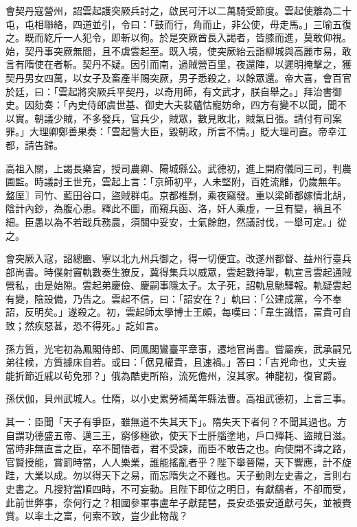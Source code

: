 \begin{pinyinscope}
 會契丹寇營州，詔雲起護突厥兵討之，啟民可汗以二萬騎受節度。雲起使離為二十屯，屯相聯絡，四道並引，令曰：「鼓而行，角而止，非公使，毋走馬。」三喻五復之。既而紇斤一人犯令，即斬以徇。於是突厥酋長入謁者，皆膝而進，莫敢仰視。始，契丹事突厥無間，且不虞雲起至。既入境，使突厥紿云詣柳城與高麗市易，敢言有隋使在者斬。契丹不疑。因引而南，過賊營百里，夜還陣，以遲明掩擊之，獲契丹男女四萬，以女子及畜產半賜突厥，男子悉殺之，以餘眾還。帝大喜，會百官於廷，曰：「雲起將突厥兵平契丹，以奇用師，有文武才，朕自舉之。」拜治書御史。因劾奏：「內史侍郎虞世基、御史大夫裴蘊怙寵妨命，四方有變不以聞，聞不以實。朝議少賊，不多發兵，官兵少，賊眾，數見敗北，賊氣日張。請付有司案罪。」大理卿鄭善果奏：「雲起訾大臣，毀朝政，所言不情。」貶大理司直。帝幸江都，請告歸。



 高祖入關，上謁長樂宮，授司農卿、陽城縣公。武德初，進上開府儀同三司，判農圃監。時議討王世充，雲起上言：「京師初平，人未堅附，百姓流離，仍歲無年。盩厔〗司竹、藍田谷口，盜賊群屯。京都椎剽，乘夜竊發。重以梁師都嫁情北胡，陰計內鈔，為腹心患。釋此不圖，而窺兵函、洛，奸人乘虛，一旦有變，禍且不細。臣愚以為不若戢兵務農，須關中妥安，士氣餘飽，然議討伐，一舉可定。」從之。



 會突厥入寇，詔總豳、寧以北九州兵御之，得一切便宜。改遂州都督、益州行臺兵部尚書。時僕射竇軌數奏生獠反，冀得集兵以威眾，雲起數持掣，軌宣言雲起通賊營私，由是始隙。雲起弟慶儉、慶嗣事隱太子。太子死，詔軌息馳驛報。軌疑雲起有變，陰設備，乃告之。雲起不信，曰：「詔安在？」軌曰：「公建成黨，今不奉詔，反明矣。」遂殺之。初，雲起師太學博士王頗，每嘆曰：「韋生識悟，富貴可自致；然疾惡甚，恐不得死。」訖如言。



 孫方質，光宅初為鳳閣侍郎、同鳳閣鸞臺平章事，遷地官尚書。嘗屬疾，武承嗣兄弟往候，方質據床自若。或曰：「倨見權貴，且速禍。」答曰：「吉兇命也，丈夫豈能折節近戚以茍免邪？」俄為酷吏所陷，流死儋州，沒其家。神龍初，復官爵。



 孫伏伽，貝州武城人。仕隋，以小史累勞補萬年縣法曹。高祖武德初，上言三事。



 其一：臣聞「天子有爭臣，雖無道不失其天下」。隋失天下者何？不聞其過也。方自謂功德盛五帝、邁三王，窮侈極欲，使天下士肝腦塗地，戶口殫耗、盜賊日滋。當時非無直言之臣，卒不聞悟者，君不受諫，而臣不敢告之也。向使開不諱之路，官賢授能，賞罰時當，人人樂業，誰能搖亂者乎？陛下舉晉陽，天下響應，計不旋跬，大業以成。勿以得天下之易，而忘隋失之不難也。天子動則左史書之，言則右史書之。凡搜狩當順四時，不可妄動。且陛下即位之明日，有獻鷂者，不卻而受，此前世弊事，奈何行之？相國參軍事盧牟子獻琵琶，長安丞張安道獻弓矢，並被賚賞。以率土之富，何索不致，豈少此物哉？




\end{pinyinscope}
